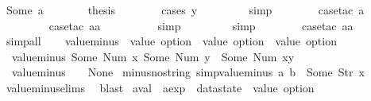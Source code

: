 \begin{isabellebody}
\ {\isacharparenleft}Some\ a{\isacharparenright}\isanewline
\ \ \ \ \isamarkupfalse%
\ \isamarkupfalse%
\ {\isacharquery}thesis\isanewline
\ \ \ \ \ \ \isamarkupfalse%
\ {\isacharparenleft}cases\ y{\isacharparenright}\isanewline
\ \ \ \ \ \ \ \isamarkupfalse%
\ simp\isanewline
\ \ \ \ \ \ \isamarkupfalse%
\ {\isacharparenleft}case{\isacharunderscore}tac\ a{\isacharparenright}\isanewline
\ \ \ \ \ \ \ \isamarkupfalse%
\ {\isacharparenleft}case{\isacharunderscore}tac\ aa{\isacharparenright}\isanewline
\ \ \ \ \ \ \ \ \isamarkupfalse%
\ simp\isanewline
\ \ \ \ \ \ \ \isamarkupfalse%
\ simp\isanewline
\ \ \ \ \ \ \isamarkupfalse%
\ {\isacharparenleft}case{\isacharunderscore}tac\ aa{\isacharparenright}\isanewline
\ \ \ \ \ \ \isamarkupfalse%
\ simp{\isacharunderscore}all\isanewline
\ \ \isamarkupfalse%
%
\endisatagproof
{\isafoldproof}%
%
\isadelimproof
\isanewline
%
\endisadelimproof
\isanewline
{}\isamarkupfalse%
\ value{\isacharunderscore}minus\ {\isacharcolon}{\isacharcolon}\ {\isachardoublequoteopen}value\ option\ {\isasymRightarrow}\ value\ option\ {\isasymRightarrow}\ value\ option{\isachardoublequoteclose}\ \ \isanewline
\ \ {\isachardoublequoteopen}value{\isacharunderscore}minus\ {\isacharparenleft}Some\ {\isacharparenleft}Num\ x{\isacharparenright}{\isacharparenright}\ {\isacharparenleft}Some\ {\isacharparenleft}Num\ y{\isacharparenright}{\isacharparenright}\ {\isacharequal}\ Some\ {\isacharparenleft}Num\ {\isacharparenleft}x{\isacharminus}y{\isacharparenright}{\isacharparenright}{\isachardoublequoteclose}\ {\isacharbar}\isanewline
\ \ {\isachardoublequoteopen}value{\isacharunderscore}minus\ {\isacharunderscore}\ {\isacharunderscore}\ {\isacharequal}\ None{\isachardoublequoteclose}\isanewline
\isanewline
{}\isamarkupfalse%
\ minus{\isacharunderscore}no{\isacharunderscore}string\ {\isacharbrackleft}simp{\isacharbrackright}{\isacharcolon}{\isachardoublequoteopen}value{\isacharunderscore}minus\ a\ b\ {\isasymnoteq}\ Some\ {\isacharparenleft}Str\ x{\isacharparenright}{\isachardoublequoteclose}\isanewline
%
\isadelimproof
\ \ %
\endisadelimproof
%
\isatagproof
{}\isamarkupfalse%
\ value{\isacharunderscore}minus{\isachardot}elims\ \isamarkupfalse%
\ blast%
\endisatagproof
{\isafoldproof}%
%
\isadelimproof
\isanewline
%
\endisadelimproof
\isanewline
{}\isamarkupfalse%
\ aval\ {\isacharcolon}{\isacharcolon}\ {\isachardoublequoteopen}aexp\ {\isasymRightarrow}\ datastate\ {\isasymRightarrow}\ value\ option{\isachardoublequoteclose}\ \isanewline

\end{isabellebody}
